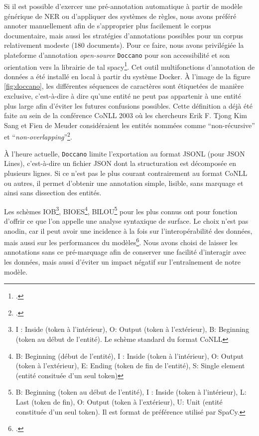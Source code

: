     Si il est possible d'exercer une pré-annotation automatique à partir de modèle générique de NER ou d'appliquer des systèmes de règles, nous avons préféré annoter manuellement afin de s'approprier plus facilement le corpus documentaire, mais aussi les stratégies d'annotations possibles pour un corpus relativement modeste (180 documents). Pour ce faire, nous avons privilégiée la plateforme d'annotation \textit{open-source} \texttt{Doccano} pour son accessibilité et son orientation vers la librairie de \gls{tal} \gls{spacy}\footcite[Cette plateforme a été programmé avec le langage python et le \textit{framework} Django.][]{nakayamaDoccano2022}. Cet outil multifonctions d'annotation de données a été installé en local à partir du système Docker. À l'image de la figure \ref{fig:doccano}, les différentes séquences de caractères sont étiquetées de manière exclusive, c'est-à-dire à dire qu'une entité ne peut pas appartenir à une entité plus large afin d'éviter les futures confusions possibles. Cette définition a déjà été faite au sein de la conférence CoNLL 2003 où les chercheurs Erik F. Tjong Kim Sang et Fien de Meuder considéraient les entités nommées comme \enquote{non-récursive} et \enquote{\textit{non-overlapping}}\footcite{sangIntroductionCoNLL2003Shared2003}.
    
    À l'heure actuelle, \texttt{Doccano} limite l'exportation au format JSONL (pour JSON Lines), c'est-à-dire un fichier JSON dont la structuration est décomposée en plusieurs lignes. Si ce n'est pas le plus courant contrairement au format CoNLL ou autres, il permet d'obtenir une annotation simple, lisible, sans marquage et ainsi sans dissection des entités.
    
    Les schèmes IOB\footnote{I : Inside (token à l'intérieur), O: Output (token à l'extérieur), B: Beginning (token au début de l'entité). Le schème standard du format CoNLL}, BIOES\footnote{B: Beginning (début de l'entité), I : Inside (token à l'intérieur), O: Output (token à l'extérieur), E: Ending (token de fin de l'entité), S: Single element (entité consituée d'un seul token)}, BILOU\footnote{B: Beginning (token au début de l'entité), I : Inside (token à l'intérieur), L: Last (token de fin), O: Output (token à l'extérieur), U: Unit (entité constituée d'un seul token). Il est format de préférence utilisé par SpaCy.} pour les plus connus ont pour fonction d'offrir ce que l'on appelle une analyse syntaxique de surface. Le choix n'est pas anodin, car il peut avoir une incidence à la fois sur l'interopérabilité des données, mais aussi sur les performances du modèles\footcite{alshammariImpactUsingDifferent2021}. Nous avons choisi de laisser les annotations sans ce pré-marquage afin de conserver une facilité d'interagir avec les données, mais aussi d'éviter un impact négatif sur l'entraînement de notre modèle.
	
